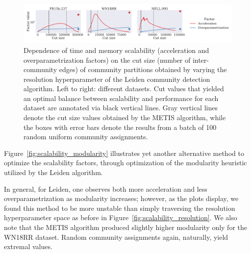\begin{figure}[!ht]%
\begin{center}
\includegraphics[width=\textwidth]{figures/coins/scalability_leiden_cut_size}
\end{center}
\caption[Dependence of time and memory scalability on the cut size of community partitions obtained by varying the resolution hyperparameter of the Leiden community detection algorithm.]{Dependence of time and memory scalability (acceleration and overparametrization factors) on the cut size (number of inter-community edges) of community partitions obtained by varying the resolution hyperparameter of the Leiden community detection algorithm. Left to right: different datasets. Cut values that yielded an optimal balance between scalability and performance for each dataset are annotated via black vertical lines. Gray vertical lines denote the cut size values obtained by the METIS algorithm, while the boxes with error bars denote the results from a batch of 100 random uniform community assignments.}
\label{fig:scalability_cut_size}
\end{figure}

Figure~\ref{fig:scalability_modularity} illustrates yet another alternative method to optimize the scalability factors, through optimization of the modularity heuristic utilized by the Leiden algorithm. 

In general, for Leiden, one observes both more acceleration and less overparametrization as modularity increases; however, as the plots display, we found this method to be more unstable than simply traversing the resolution hyperparameter space as before in Figure~\ref{fig:scalability_resolution}. We also note that the METIS algorithm produced slightly higher modularity only for the WN18RR dataset. Random community assignments again, naturally, yield extremal values.

